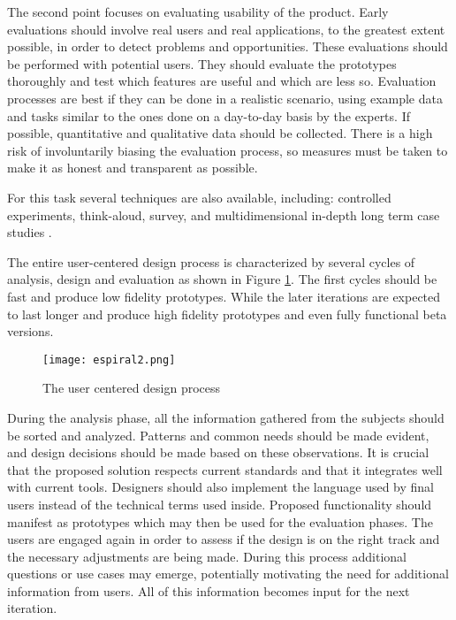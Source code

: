 \smallskip

The second point focuses on evaluating usability of the product.  Early evaluations should involve real users and real applications, to the greatest extent possible, in order to detect problems and opportunities. These evaluations should be performed with potential users. They should evaluate the prototypes thoroughly and test which features are useful and which are less so. Evaluation processes are best if they can be done in a realistic scenario, using example data and tasks similar to the ones done on a day-to-day basis by the experts. If possible, quantitative and qualitative data should be collected. There is a high risk of involuntarily biasing the evaluation process, so measures must be taken to make it as honest and transparent as possible.

For this task several techniques are also available, including: controlled experiments, think-aloud, survey, and multidimensional in-depth long term case studies \autocite{shneiderman_strategies_2006}.

\smallskip

The entire user-centered design process is characterized by several cycles of analysis, design and evaluation as shown in Figure \ref{intro_spiral}. The first cycles should be fast and produce low fidelity prototypes. While the later iterations are expected to last longer and produce high fidelity prototypes and even fully functional beta versions.

\begin{figure}
\centering
\texttt{[image: espiral2.png]}
\caption{ \label{intro_spiral} The user centered design process}
\end{figure}

During the analysis phase, all the information gathered from the subjects should be sorted and analyzed. Patterns and common needs should be made evident, and design decisions should be made based on these observations. It is crucial that the proposed solution respects current standards and that it integrates well with current tools. Designers should also implement the language used by final users instead of the technical terms used inside.  Proposed functionality should manifest as prototypes which may then be used for the evaluation phases. The users are engaged again in order to assess if the design is on the right track and the necessary adjustments are being made. During this process additional questions or use cases may emerge, potentially motivating the need for additional information from users. All of this information becomes input for the next iteration.

